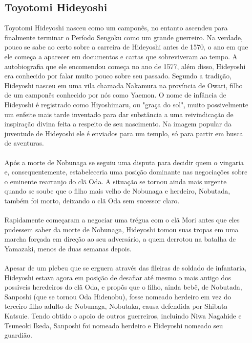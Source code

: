 \documentclass[12pt, a4paper]{article}
\begin{document}
        \subsection {Toyotomi Hideyoshi}
             Toyotomi Hideyoshi nasceu como um camponês, no entanto ascendeu para finalmente terminar o Período Sengoku como um grande guerreiro. Na verdade, pouco se sabe ao certo sobre a carreira de Hideyoshi antes de 1570, o ano em que ele começa a aparecer em documentos e cartas que sobreviveram ao tempo. A autobiografia que ele encomendou começa no ano de 1577, além disso, Hideyoshi era conhecido por falar muito pouco sobre seu passado. Segundo a tradição, Hideyoshi nasceu em uma vila chamada Nakamura na província de Owari, filho de um camponês conhecido por nós como Yaemon. O nome de infância de Hideyoshi é registrado como Hiyoshimaru, ou "graça do sol", muito possivelmente um enfeite mais tarde inventado para dar substância a uma reivindicação de inspiração divina feita a respeito de seu nascimento. Na imagem popular da juventude de Hideyoshi ele é enviados para um templo, só para partir em busca de aventuras.\\
            \\
            \indent Após a morte de Nobunaga se seguiu uma disputa para decidir quem o vingaria e, consequentemente, estabeleceria uma posição dominante nas negociações sobre o eminente rearranjo do clã Oda. A situação se tornou ainda mais urgente quando se soube que o filho mais velho de Nobunaga e herdeiro, Nobutada, também foi morto, deixando o clã Oda sem sucessor claro.\\
            \\
            \indent Rapidamente começaram a negociar uma trégua com o clã Mori antes que eles pudessem saber da morte de Nobunaga, Hideyoshi tomou suas tropas em uma marcha forçada em direção ao seu adversário, a quem derrotou na batalha de Yamazaki, menos de duas semanas depois.\\
            \\
            \indent Apesar de um plebeu que se erguera através das fileiras de soldado de infantaria, Hideyoshi estava agora em posição de desafiar até mesmo o mais antigo dos possiveis heredeiros do clã Oda, e propôs que o filho, ainda bebê, de Nobutada, Sanposhi (que se tornou Oda Hidenobu), fosse nomeado herdeiro em vez do terceiro filho adulto de Nobunaga, Nobutaka, causa defendida por Shibata Katsuie. Tendo obtido o apoio de outros guerreiros, incluindo Niwa Nagahide e Tsuneoki Ikeda, Sanposhi foi nomeado herdeiro e Hideyoshi nomeado seu guardião.\\
\end{document}

